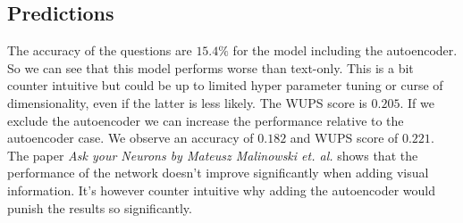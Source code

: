 \documentclass[10pt,a4paper]{report}
\begin{document}
	\subsection*{Predictions}
	The accuracy of the questions are $ 15.4\% $ for the model including the autoencoder. So we can see that this model performs worse than text-only. This is a bit counter intuitive but could be up to limited hyper parameter tuning or curse of dimensionality, even if the latter is less likely. The WUPS score is $ 0.205 $. If we exclude the autoencoder we can increase the performance relative to the autoencoder case. We observe an accuracy of $ 0.182 $ and WUPS score of $ 0.221 $. The paper \textit{Ask your Neurons by Mateusz Malinowski et. al.} shows that the performance of the network doesn't improve significantly when adding visual information. It's however counter intuitive why adding the autoencoder would punish the results so significantly.  
	
	
\end{document}
